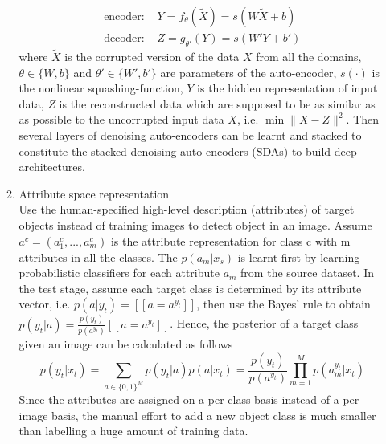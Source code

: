 \documentclass[prodmode]{acmsmall}  %
\begin{document}
\begin{itemize}
\begin{enumerate}
\begin{align}
\text{encoder: } & Y=f_{\theta}(\tilde{X})=s(W\tilde{X}+b)\\
\text{decoder: } & Z=g_{\theta'}(Y)=s(W'Y+b')
\end{align}
where $\tilde{X}$ is the corrupted version of the data $X$ from all the domains, $\theta \in{\{W,b\}}$ and $\theta' \in{\{W',b'\}}$ are parameters of the auto-encoder, $s(\cdot)$ is the nonlinear squashing-function, $Y$ is the hidden representation of input data, $Z$ is the reconstructed data which are supposed to be as similar as as possible to the uncorrupted input data $X$, i.e. $\min\|X-Z\|^2$. Then several layers of denoising auto-encoders can be learnt and stacked to constitute the stacked denoising auto-encoders (SDAs) to build deep architectures.
\item Attribute space representation~\cite{Lampert2009}\\
Use the human-specified high-level description (attributes) of target objects instead of training images to detect object in an image. Assume $a^c = (a_1^c,...,a_m^c)$ is the attribute representation for class c with m attributes in all the classes. The $p(a_m|x_s)$ is learnt first by learning probabilistic classifiers for each attribute $a_m$ from the source dataset. In the test stage, assume each target class is determined by its attribute vector, i.e. $p(a|y_t)=[[a=a^{y_t}]]$, then use the Bayes' rule to obtain $p(y_t|a)=\frac{p(y_t)}{p(a^{y_t})}[[a=a^{y_t}]]$. Hence, the posterior of a target class given an image can be calculated as follows
\begin{equation}
p(y_t|x_t)=\sum_{a\in\{0,1\}^M}p(y_t|a)p(a|x_t)=\frac{p(y_t)}{p(a^{y_t})}\prod_{m=1}^Mp(a_m^{y_t}|x_t)
\end{equation}
Since the attributes are assigned on a per-class basis instead of a per-image basis, the manual effort to add a new object class is much smaller than labelling a huge amount of training data.
\end{enumerate}


\end{itemize}
\end{document}
